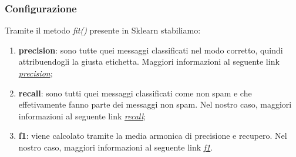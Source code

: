 \subsubsection{Configurazione}
Tramite il metodo \textit{fit()} presente in Sklearn stabiliamo:
\begin{enumerate}
	\item \textbf{precision}: sono tutte quei messaggi classificati nel modo corretto, quindi attribuendogli la giusta etichetta. Maggiori informazioni al seguente link \href{https://scikit-learn.org/stable/modules/generated/sklearn.metrics.precision_score.html#sklearn.metrics.precision_score}{\textit{precision}};	
	\item \textbf{recall}: sono tutti quei messaggi classificati come non spam e che effetivamente fanno parte dei messaggi non spam. Nel nostro caso, maggiori informazioni al seguente link \href{https://scikit-learn.org/stable/modules/generated/sklearn.metrics.recall\_score.html#sklearn.metrics.recall\_score}{\textit{recall}};
	\item \textbf{f1}: viene calcolato tramite la media armonica di precisione e recupero. Nel nostro caso, maggiori informazioni al seguente link \href{https://scikit-learn.org/stable/modules/generated/sklearn.metrics.f1_score.html}{\textit{f1}}.  
\end{enumerate} 
